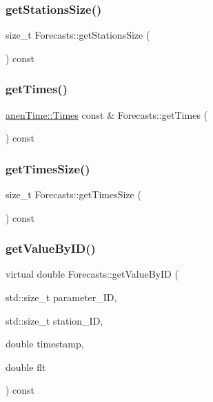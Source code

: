\subsubsection{\texorpdfstring{get\+Stations\+Size()}{getStationsSize()}}
{\footnotesize\ttfamily size\+\_\+t Forecasts\+::get\+Stations\+Size (\begin{DoxyParamCaption}{ }\end{DoxyParamCaption}) const}

\mbox{\label{class_forecasts_ac256fce5eb5e6e773f7f8579bf10c7d7}} 
\subsubsection{\texorpdfstring{get\+Times()}{getTimes()}}
{\footnotesize\ttfamily \mbox{\hyperlink{classanen_time_1_1_times}{anen\+Time\+::\+Times}} const  \& Forecasts\+::get\+Times (\begin{DoxyParamCaption}{ }\end{DoxyParamCaption}) const}

\mbox{\label{class_forecasts_a8436043f928220ba29efd4c7d7c0c8a4}} 
\subsubsection{\texorpdfstring{get\+Times\+Size()}{getTimesSize()}}
{\footnotesize\ttfamily size\+\_\+t Forecasts\+::get\+Times\+Size (\begin{DoxyParamCaption}{ }\end{DoxyParamCaption}) const}

\mbox{\label{class_forecasts_a1f2249027814ba541362e700d206ae55}} 
\subsubsection{\texorpdfstring{get\+Value\+By\+I\+D()}{getValueByID()}}
{\footnotesize\ttfamily virtual double Forecasts\+::get\+Value\+By\+ID (\begin{DoxyParamCaption}\item[{std\+::size\+\_\+t}]{parameter\+\_\+\+ID,  }\item[{std\+::size\+\_\+t}]{station\+\_\+\+ID,  }\item[{double}]{timestamp,  }\item[{double}]{flt }\end{DoxyParamCaption}) const\hspace{0.3cm}{\ttfamily [pure virtual]}}

